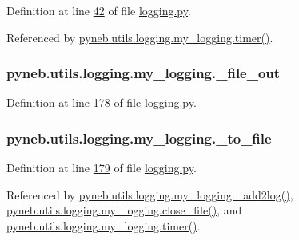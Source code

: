 Definition at line \hyperlink{logging_8py_source_l00042}{42} of file \hyperlink{logging_8py_source}{logging.\-py}.



Referenced by \hyperlink{logging_8py_source_l00115}{pyneb.\-utils.\-logging.\-my\-\_\-logging.\-timer()}.

\hypertarget{classpyneb_1_1utils_1_1logging_1_1my__logging_ac22b310e16b6f3a4790ac7658b2c0284}{
\subsubsection[{\-\_\-file\-\_\-out}]{\setlength{\rightskip}{0pt plus 5cm}pyneb.\-utils.\-logging.\-my\-\_\-logging.\-\_\-file\-\_\-out\hspace{0.3cm}{\ttfamily [private]}}}\label{classpyneb_1_1utils_1_1logging_1_1my__logging_ac22b310e16b6f3a4790ac7658b2c0284}


Definition at line \hyperlink{logging_8py_source_l00178}{178} of file \hyperlink{logging_8py_source}{logging.\-py}.

\hypertarget{classpyneb_1_1utils_1_1logging_1_1my__logging_a6fd66745606a3cc0477edafcfdd24fe2}{
\subsubsection[{\-\_\-to\-\_\-file}]{\setlength{\rightskip}{0pt plus 5cm}pyneb.\-utils.\-logging.\-my\-\_\-logging.\-\_\-to\-\_\-file\hspace{0.3cm}{\ttfamily [private]}}}\label{classpyneb_1_1utils_1_1logging_1_1my__logging_a6fd66745606a3cc0477edafcfdd24fe2}


Definition at line \hyperlink{logging_8py_source_l00179}{179} of file \hyperlink{logging_8py_source}{logging.\-py}.



Referenced by \hyperlink{logging_8py_source_l00059}{pyneb.\-utils.\-logging.\-my\-\_\-logging.\-\_\-add2log()}, \hyperlink{logging_8py_source_l00183}{pyneb.\-utils.\-logging.\-my\-\_\-logging.\-close\-\_\-file()}, and \hyperlink{logging_8py_source_l00115}{pyneb.\-utils.\-logging.\-my\-\_\-logging.\-timer()}.

